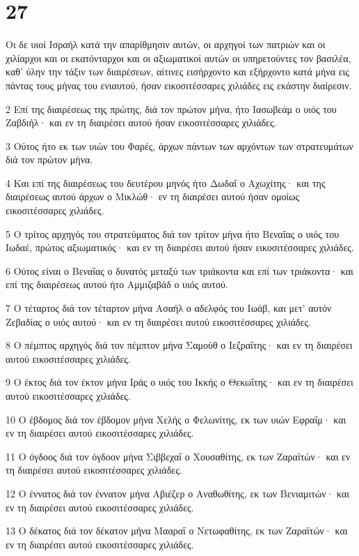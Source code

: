 \chapter{27}

\par Οι δε υιοί Ισραήλ κατά την απαρίθμησιν αυτών, οι αρχηγοί των πατριών και οι χιλίαρχοι και οι εκατόνταρχοι και οι αξιωματικοί αυτών οι υπηρετούντες τον βασιλέα, καθ' ύλην την τάξιν των διαιρέσεων, αίτινες εισήρχοντο και εξήρχοντο κατά μήνα εις πάντας τους μήνας του ενιαυτού, ήσαν εικοσιτέσσαρες χιλιάδες εις εκάστην διαίρεσιν.
\par 2 Επί της διαιρέσεως της πρώτης, διά τον πρώτον μήνα, ήτο Ιασωβεάμ ο υιός του Ζαβδιήλ· και εν τη διαιρέσει αυτού ήσαν εικοσιτέσσαρες χιλιάδες.
\par 3 Ούτος ήτο εκ των υιών του Φαρές, άρχων πάντων των αρχόντων των στρατευμάτων διά τον πρώτον μήνα.
\par 4 Και επί της διαιρέσεως του δευτέρου μηνός ήτο Δωδαΐ ο Αχωχίτης· και της διαιρέσεως αυτού άρχων ο Μικλώθ· εν τη διαιρέσει αυτού ήσαν ομοίως εικοσιτέσσαρες χιλιάδες.
\par 5 Ο τρίτος αρχηγός του στρατεύματος διά τον τρίτον μήνα ήτο Βεναΐας ο υιός του Ιωδαέ, πρώτος αξιωματικός· και εν τη διαιρέσει αυτού ήσαν εικοσιτέσσαρες χιλιάδες.
\par 6 Ούτος είναι ο Βεναΐας ο δυνατός μεταξύ των τριάκοντα και επί των τριάκοντα· και επί της διαιρέσεως αυτού ήτο Αμμιζαβάδ ο υιός αυτού.
\par 7 Ο τέταρτος διά τον τέταρτον μήνα Ασαήλ ο αδελφός του Ιωάβ, και μετ' αυτόν Ζεβαδίας ο υιός αυτού· και εν τη διαιρέσει αυτού εικοσιτέσσαρες χιλιάδες.
\par 8 Ο πέμπτος αρχηγός διά τον πέμπτον μήνα Σαμούθ ο Ιεζραΐτης· και εν τη διαιρέσει αυτού εικοσιτέσσαρες χιλιάδες.
\par 9 Ο έκτος διά τον έκτον μήνα Ιράς ο υιός του Ικκής ο Θεκωΐτης· και εν τη διαιρέσει αυτού εικοσιτέσσαρες χιλιάδες.
\par 10 Ο έβδομος διά τον έβδομον μήνα Χελής ο Φελωνίτης, εκ των υιών Εφραΐμ· και εν τη διαιρέσει αυτού εικοσιτέσσαρες χιλιάδες.
\par 11 Ο όγδοος διά τον όγδοον μήνα Σιββεχαΐ ο Χουσαθίτης, εκ των Ζαραϊτών· και εν τη διαιρέσει αυτού εικοσιτέσσαρες χιλιάδες.
\par 12 Ο έννατος διά τον έννατον μήνα Αβιέζερ ο Αναθωθίτης, εκ των Βενιαμιτών· και εν τη διαιρέσει αυτού εικοσιτέσσαρες χιλιάδες.
\par 13 Ο δέκατος διά τον δέκατον μήνα Μααραΐ ο Νετωφαθίτης, εκ των Ζαραϊτών· και εν τη διαιρέσει αυτού εικοσιτέσσαρες χιλιάδες.
